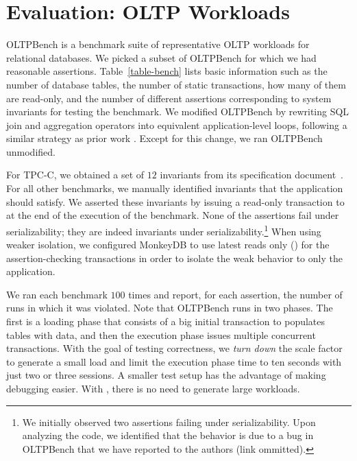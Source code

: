 
\section{Evaluation: OLTP Workloads}
\label{sec:oltp}

OLTPBench \cite{difallah2013oltp} is a benchmark suite of representative 
OLTP workloads for relational databases.
We picked a subset of OLTPBench for which we had reasonable assertions. 
Table~\ref{table-bench} lists basic
information such as the number of database tables, the
number of static transactions, how many of them are read-only, and the number of
different assertions corresponding to system invariants for testing the benchmark. 
We modified OLTPBench by rewriting SQL join and aggregation
operators 
into equivalent application-level
loops, following a similar strategy as prior work \cite{clotho}. Except for
this change, we ran OLTPBench unmodified. 

For TPC-C, we obtained a set of $12$ invariants from its specification
document~\cite{tpcc-spec}. For all other benchmarks, we manually identified 
invariants that the application should satisfy. We asserted these invariants 
by issuing a read-only transaction to \tool{} 
at the end of the execution of the benchmark. 
None of the assertions fail under serializability; they are indeed invariants
under serializability.\footnote{We initially observed two assertions failing
under serializability. Upon analyzing the code, we identified that the
behavior is due to a bug in OLTPBench that we have reported to the authors (link
ommitted).} 
When using weaker isolation, we configured MonkeyDB to use latest reads only
() for the assertion-checking transactions 
in order to isolate the weak behavior to only the application. 

We ran each benchmark $100$ times and report, for each assertion, the number of
runs in which it was violated. Note that OLTPBench runs in two phases. The first
is a loading phase that consists of a big initial transaction to populates tables 
with data, and then the execution phase issues multiple concurrent transactions. 
With the goal of testing correctness, we \textit{turn down} the scale factor to
generate a small load and limit the execution phase time to ten seconds with 
just two or three sessions. A smaller test setup has the advantage
of making debugging easier. With \tool{}, there is no need to generate large
workloads.

